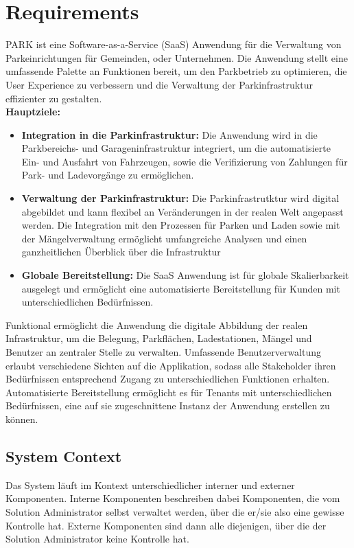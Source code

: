 \section{Requirements}

PARK ist eine Software-as-a-Service (SaaS) Anwendung für die Verwaltung von Parkeinrichtungen für Gemeinden, oder Unternehmen.
Die Anwendung stellt eine umfassende Palette an Funktionen bereit, um den Parkbetrieb zu optimieren, 
die User Experience zu verbessern und die Verwaltung der Parkinfrastruktur effizienter zu gestalten.  \\


\textbf{Hauptziele:}

\begin{itemize}
    \item \textbf{Integration in die Parkinfrastruktur:} Die Anwendung wird in die Parkbereichs- und Garageninfrastruktur integriert, um die automatisierte Ein- und Ausfahrt von Fahrzeugen, sowie die Verifizierung von Zahlungen für Park- und Ladevorgänge zu ermöglichen.
    \item \textbf{Verwaltung der Parkinfrastruktur:} Die Parkinfrastrutktur wird digital abgebildet und kann flexibel an Veränderungen in der realen Welt angepasst werden. Die Integration mit den Prozessen für Parken und Laden sowie mit der Mängelverwaltung ermöglicht umfangreiche Analysen und einen ganzheitlichen Überblick über die Infrastruktur
    \item \textbf{Globale Bereitstellung:} Die SaaS Anwendung ist für globale Skalierbarkeit ausgelegt und ermöglicht eine automatisierte Bereitstellung für Kunden mit unterschiedlichen Bedürfnissen.
\end{itemize}


Funktional ermöglicht die Anwendung die digitale Abbildung der realen Infrastruktur, um die Belegung, Parkflächen, Ladestationen, Mängel und Benutzer an zentraler Stelle zu verwalten. Umfassende Benutzerverwaltung erlaubt verschiedene Sichten auf die Applikation, sodass alle Stakeholder ihren Bedürfnissen entsprechend Zugang zu unterschiedlichen Funktionen erhalten. Automatisierte Bereitstellung ermöglicht es für Tenants mit unterschiedlichen Bedürfnissen, eine auf sie zugeschnittene Instanz der Anwendung erstellen zu können.


\subsection{System Context}

Das System läuft im Kontext unterschiedlicher interner und externer Komponenten. Interne Komponenten beschreiben dabei Komponenten, die vom Solution Administrator selbst verwaltet werden, über die er/sie also eine gewisse Kontrolle hat. Externe Komponenten sind dann alle diejenigen, über die der Solution Administrator keine Kontrolle hat. 

